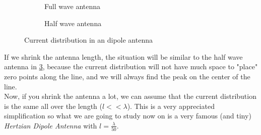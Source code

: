 \begin{figure}[H]
        \centering
        \begin{subfigure}[b]{0.45\textwidth}\centering
        \caption{Full wave antenna}\label{fig:Full_wave_antenna} 
    \end{subfigure}%
    \hfill
    \begin{subfigure}[b]{0.45\textwidth}\centering
        \caption{Half wave antenna}\label{fig:Half_wave_antenna}
    \end{subfigure}\caption{Current distribution in an dipole antenna}
\end{figure}
If we shrink the antenna length, the situation will be similar to the half wave antenna in \cref{fig:Half_wave_antenna}, because the current distribution will not have much space to "place" zero points along the line, and we will always find the peak on the center of the line.\\
Now, if you shrink the antenna a lot, we can assume that the current distribution is the same all over the length ($l<<\lambda$). This is a very appreciated simplification so what we are going to study now on is a very famous (and tiny) \emph{Hertzian Dipole Antenna} with $l=\frac{\lambda}{50}$.
